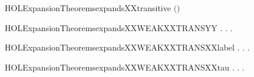 \newcommand{\HOLExpansionTheoremsexpandsXXTRANSXXtauYY}{\UseVerbatim{HOLExpansionTheoremsexpandsXXTRANSXXtauYY}}
\begin{SaveVerbatim}{HOLExpansionTheoremsexpandsXXtransitive}
\HOLTokenTurnstile{}  \ensuremath{(}\ensuremath{)}
\end{SaveVerbatim}
\newcommand{\HOLExpansionTheoremsexpandsXXtransitive}{\UseVerbatim{HOLExpansionTheoremsexpandsXXtransitive}}
\begin{SaveVerbatim}{HOLExpansionTheoremsexpandsXXWEAKXXTRANSYY}
\HOLTokenTurnstile{} \HOLSymConst{\HOLTokenForall{}} .
          \HOLSymConst{\HOLTokenImp{}}
       \HOLSymConst{\HOLTokenForall{}} .  \HOLTokenWeakTransBegin{}\HOLTokenWeakTransEnd {} \HOLSymConst{\HOLTokenImp{}} \HOLSymConst{\HOLTokenExists{}}.  \HOLTokenWeakTransBegin{}\HOLTokenWeakTransEnd {} \HOLSymConst{\HOLTokenConj{}}   
\end{SaveVerbatim}
\newcommand{\HOLExpansionTheoremsexpandsXXWEAKXXTRANSYY}{\UseVerbatim{HOLExpansionTheoremsexpandsXXWEAKXXTRANSYY}}
\begin{SaveVerbatim}{HOLExpansionTheoremsexpandsXXWEAKXXTRANSXXlabel}
\HOLTokenTurnstile{} \HOLSymConst{\HOLTokenForall{}} .
          \HOLSymConst{\HOLTokenImp{}}
       \HOLSymConst{\HOLTokenForall{}} .
            \HOLTokenWeakTransBegin{} \HOLTokenWeakTransEnd {} \HOLSymConst{\HOLTokenImp{}} \HOLSymConst{\HOLTokenExists{}}.  \HOLTokenWeakTransBegin{} \HOLTokenWeakTransEnd {} \HOLSymConst{\HOLTokenConj{}}   
\end{SaveVerbatim}
\newcommand{\HOLExpansionTheoremsexpandsXXWEAKXXTRANSXXlabel}{\UseVerbatim{HOLExpansionTheoremsexpandsXXWEAKXXTRANSXXlabel}}
\begin{SaveVerbatim}{HOLExpansionTheoremsexpandsXXWEAKXXTRANSXXtau}
\HOLTokenTurnstile{} \HOLSymConst{\HOLTokenForall{}} .
          \HOLSymConst{\HOLTokenImp{}}
       \HOLSymConst{\HOLTokenForall{}}.  \HOLTokenWeakTransBegin\HOLConst{\ensuremath{\tau}}\HOLTokenWeakTransEnd {} \HOLSymConst{\HOLTokenImp{}} \HOLSymConst{\HOLTokenExists{}}.    \HOLSymConst{\HOLTokenConj{}}   
\end{SaveVerbatim}
